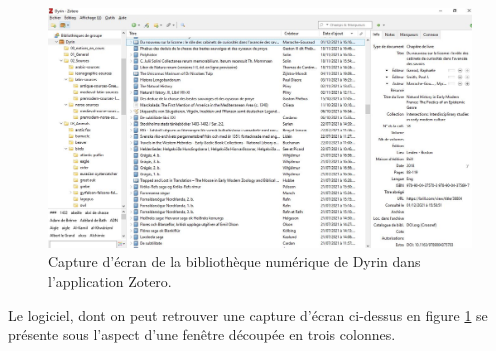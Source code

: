 \documentclass[a4paper,12pt,twoside]{book}
\begin{document}
\begin{figure}[H]
    \centering
    \includegraphics[width=\linewidth]{img/partie_3/zotero_dyrin.JPG}
    \caption{Capture d'écran de la bibliothèque numérique de Dyrin dans l'application Zotero.}
    \label{zoterogui}
\end{figure}

Le logiciel, dont on peut retrouver une capture d'écran ci-dessus en figure \ref{zoterogui} se présente sous l'aspect d'une fenêtre découpée en trois colonnes. 
\end{document}
